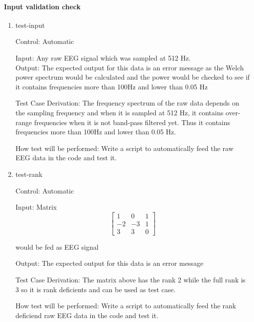 \documentclass[12pt, titlepage]{article}
\begin{document}

\paragraph{Input validation check}

\begin{enumerate}

\item{test-input\\}

Control: Automatic
					
Input: Any raw EEG signal which was sampled at 512 Hz.	\\				
Output: The expected output for this data is an error message as the Welch power spectrum would be calculated and the power would be checked to see if it contains frequencies more than 100Hz and lower than 0.05 Hz

Test Case Derivation:  The frequency spectrum of the raw data depends on the sampling frequency and when it is sampled at 512 Hz, it contains over-range frequencies when it is not band-pass filtered yet. Thus it contains frequencies more than 100Hz and lower than 0.05 Hz.

					
How test will be performed: Write a script to automatically feed the raw EEG data in the code and test it.
					
\item{test-rank\\}

Control: Automatic
					
Input: Matrix 
\[
\begin{bmatrix}
1 & 0 & 1\\
-2 & -3 & 1\\
3 & 3 & 0
\end{bmatrix} 
\]

would be fed as EEG signal
					
Output: The expected output for this data is an error message 

Test Case Derivation: The matrix above has the rank 2 while the full rank is 3 so it is rank deficients and can be used as test case.

How test will be performed: Write a script to automatically feed the rank deficiend raw EEG data in the code and test it.

\end{enumerate}
\end{document}
